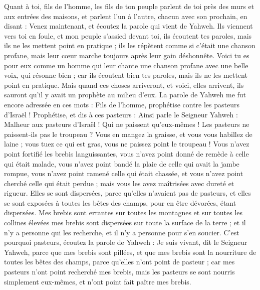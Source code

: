 \begin{multicols}{2}
Quant à toi, fils de l'homme, les fils de ton peuple parlent de toi près des murs et aux entrées des maisons, et parlent l'un à l'autre, chacun avec son prochain, en disant : Venez maintenant, et écoutez la parole qui vient de Yahweh.
Ils viennent vers toi en foule, et mon peuple s'assied devant toi, ils écoutent tes paroles, mais ils ne les mettent point en pratique ; ils les répètent comme si c'était une chanson profane, mais leur cœur marche toujours après leur gain déshonnête.
Voici tu es pour eux comme un homme qui leur chante une chanson profane avec une belle voix, qui résonne bien ; car ils écoutent bien tes paroles, mais ils ne les mettent point en pratique.
Mais quand ces choses arriveront, et voici, elles arrivent, ils sauront qu'il y avait un prophète au milieu d'eux.
\VerseOne{}La parole de Yahweh me fut encore adressée en ces mots :
Fils de l'homme, prophétise contre les pasteurs d'Israël ! Prophétise, et dis à ces pasteurs : Ainsi parle le Seigneur Yahweh : Malheur aux pasteurs d'Israël ! Qui ne paissent qu'eux-mêmes ! Les pasteurs ne paissent-ils pas le troupeau ?
Vous en mangez la graisse, et vous vous habillez de laine ; vous tuez ce qui est gras, vous ne paissez point le troupeau !
Vous n'avez point fortifié les brebis languissantes, vous n'avez point donné de remède à celle qui était malade, vous n'avez point bandé la plaie de celle qui avait la jambe rompue, vous n'avez point ramené celle qui était chassée, et vous n'avez point cherché celle qui était perdue ; mais vous les avez maîtrisées avec dureté et rigueur.
Elles se sont dispersées, parce qu'elles n'avaient pas de pasteurs, et elles se sont exposées à toutes les bêtes des champs, pour en être dévorées, étant dispersées.
Mes brebis sont errantes sur toutes les montagnes et sur toutes les collines élevées mes brebis sont dispersées sur toute la surface de la terre ; et il n'y a personne qui les recherche, et il n'y a personne pour s'en soucier.
C'est pourquoi pasteurs, écoutez la parole de Yahweh :
Je suis vivant, dit le Seigneur Yahweh, parce que mes brebis sont pillées, et que mes brebis sont la nourriture de toutes les bêtes des champs, parce qu'elles n'ont point de pasteur ; car mes pasteurs n'ont point recherché mes brebis, mais les pasteurs se sont nourris simplement eux-mêmes, et n'ont point fait paître mes brebis.

\end{multicols}
